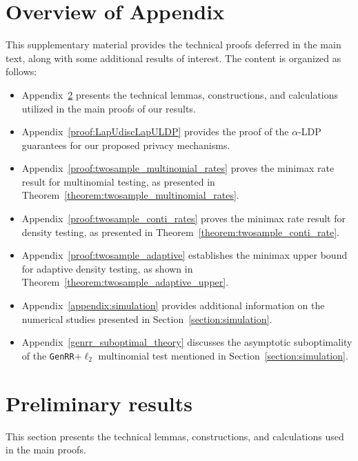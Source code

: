 \documentclass[twoside,11pt]{article}
\newcommand{\privacyParameter}{\alpha} %
\begin{document}
\begin{appendix}
	\section{Overview of Appendix}\label{appendix}%
	This supplementary material provides the technical proofs deferred in the main text, along with some additional results of interest. The content is organized as follows:
	
	\begin{itemize}
		\item Appendix~\ref{section:appendix_prelim} presents the technical lemmas, constructions, and calculations utilized in the main proofs of our results.
		\item Appendix~\ref{proof:LapUdiscLapULDP} provides the proof of the $\privacyParameter$-LDP guarantees for our proposed privacy mechanisms.
		\item Appendix~\ref{proof:twosample_multinomial_rates} proves the minimax rate result for multinomial testing, as presented in Theorem~\ref{theorem:twosample_multinomial_rates}.
		\item Appendix~\ref{proof:twosample_conti_rates} proves the minimax rate result for density testing, as presented in Theorem~\ref{theorem:twosample_conti_rate}.
		\item Appendix~\ref{proof:twosample_adaptive} establishes the minimax upper bound for adaptive density testing, as shown in Theorem~\ref{theorem:twosample_adaptive_upper}.
		\item Appendix~\ref{appendix:simulation} provides additional information on the numerical studies presented in Section~\ref{section:simulation}.
		\item Appendix~\ref{genrr_suboptimal_theory} discusses the asymptotic suboptimality of the \texttt{GenRR}+$\ell_2$ multinomial test mentioned in Section~\ref{section:simulation}.
	\end{itemize}
	
	
	\section{Preliminary results}\label{section:appendix_prelim}
	This section presents the technical lemmas, constructions, and calculations used in the main proofs.

\end{appendix}
\end{document}
